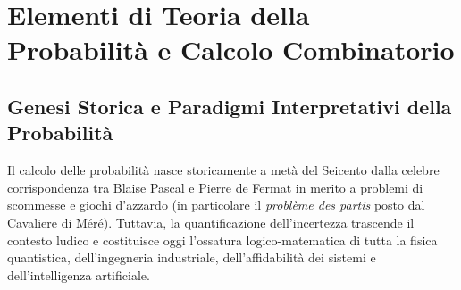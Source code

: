 \chapter{Elementi di Teoria della Probabilità e Calcolo Combinatorio}
\label{cap:elementi_di_probabilita}

\begin{abstract}
Il presente capitolo introduce l'impianto formale e concettuale del calcolo delle probabilità moderno. Partendo dall'evoluzione epistemologica del concetto di probabilità (dalla definizione classica di Laplace, al paradigma frequentista di von Mises, fino all'approccio soggettivista di de Finetti), viene presentata l'assiomatizzazione di Kolmogorov su spazi di misura $(\Omega, \mathcal{F}, \mathbb{P})$. Vengono fornite le dimostrazioni analitiche rigorose di tutte le proprietà fondamentali (probabilità dell'evento complementare, monotonia, formule di inclusione-esclusione di Poincaré, disuguaglianze di Boole e Bonferroni). Nella seconda parte, si sviluppa organicamente l'algebra del campionamento e del calcolo combinatorio (permutazioni, disposizioni, combinazioni semplici e con ripetizione, coefficienti multinomiali), applicandola alla risoluzione analitica di problemi storici ed esami universitari classici come il paradosso del compleanno.
\end{abstract}

\section{Genesi Storica e Paradigmi Interpretativi della Probabilità}
\label{sec:paradigmi_probabilita}

Il calcolo delle probabilità nasce storicamente a metà del Seicento dalla celebre corrispondenza tra Blaise Pascal e Pierre de Fermat in merito a problemi di scommesse e giochi d'azzardo (in particolare il \emph{problème des partis} posto dal Cavaliere di Méré). Tuttavia, la quantificazione dell'incertezza trascende il contesto ludico e costituisce oggi l'ossatura logico-matematica di tutta la fisica quantistica, dell'ingegneria industriale, dell'affidabilità dei sistemi e dell'intelligenza artificiale.

